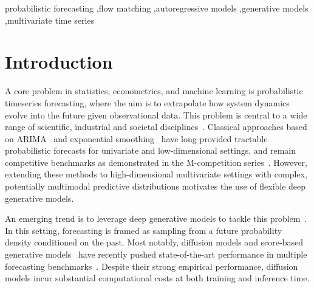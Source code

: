 \documentclass[preprint,12pt,authoryear]{elsarticle}
\newcommand{\oldrev}[1]{#1}
\begin{document}
\begin{frontmatter}


\begin{keyword}
probabilistic forecasting \sep flow matching \sep autoregressive models \sep generative models \sep multivariate time series



\end{keyword}

\end{frontmatter}



\section{Introduction}
\label{sec:Introduction}
A core problem in statistics, econometrics, and machine learning is probabilistic timeseries forecasting, where the aim is to extrapolate how system dynamics evolve into the future given observational data. This problem is central to a wide range of scientific, industrial and societal disciplines~\citep{Lim2021Timeseries,Dama2021Timeseries,Liang2024Survey}. \oldrev{Classical approaches based on ARIMA~\citep{Box1994Timeseries} and exponential smoothing~\citep{hyndman2008forecasting} have long provided tractable probabilistic forecasts for univariate and low-dimensional settings, and remain competitive benchmarks as demonstrated in the M-competition series~\citep{makridakis2020m4}. However, extending these methods to high-dimensional multivariate settings with complex, potentially multimodal predictive distributions motivates the use of flexible deep generative models.}

An emerging trend is to leverage deep generative models to tackle this problem~\citep{karl2016deep, rasul2020multivariate, desai2021timevae}. In this setting, forecasting is framed as sampling from a future probability density conditioned on the past. Most notably, diffusion models and score-based generative models~\citep{sohl2015deep, ho2020denoising, song2020score} have recently pushed state-of-the-art performance in multiple forecasting benchmarks~\citep{rasul2021autoregressive, tashiro2021csdi, kollovieh2023predict, meijer2024rise}. Despite their \oldrev{strong empirical performance, diffusion models incur substantial computational costs at both training and inference time.}
\end{document}
